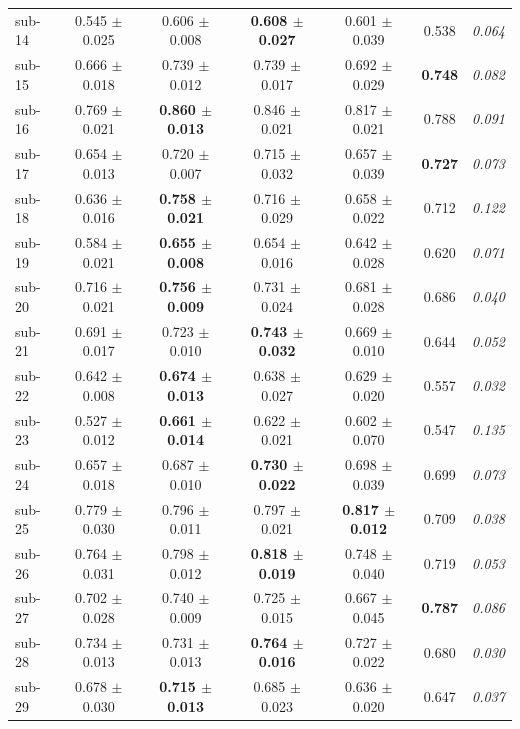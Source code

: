 \begin{table}[t]
\begin{tabular}{lcccccc}
sub-14 & 0.545 $\pm$ 0.025 & 0.606 $\pm$ 0.008 & \textbf{0.608 $\pm$ 0.027} & 0.601 $\pm$ 0.039 & 0.538 & \textit{0.064} \\
sub-15 & 0.666 $\pm$ 0.018 & 0.739 $\pm$ 0.012 & 0.739 $\pm$ 0.017 & 0.692 $\pm$ 0.029 & \textbf{0.748} & \textit{0.082} \\
sub-16 & 0.769 $\pm$ 0.021 & \textbf{0.860 $\pm$ 0.013} & 0.846 $\pm$ 0.021 & 0.817 $\pm$ 0.021 & 0.788 & \textit{0.091} \\
sub-17 & 0.654 $\pm$ 0.013 & 0.720 $\pm$ 0.007 & 0.715 $\pm$ 0.032 & 0.657 $\pm$ 0.039 & \textbf{0.727} & \textit{0.073} \\
sub-18 & 0.636 $\pm$ 0.016 & \textbf{0.758 $\pm$ 0.021} & 0.716 $\pm$ 0.029 & 0.658 $\pm$ 0.022 & 0.712 & \textit{0.122} \\
sub-19 & 0.584 $\pm$ 0.021 & \textbf{0.655 $\pm$ 0.008} & 0.654 $\pm$ 0.016 & 0.642 $\pm$ 0.028 & 0.620 & \textit{0.071} \\
sub-20 & 0.716 $\pm$ 0.021 & \textbf{0.756 $\pm$ 0.009} & 0.731 $\pm$ 0.024 & 0.681 $\pm$ 0.028 & 0.686 & \textit{0.040} \\
sub-21 & 0.691 $\pm$ 0.017 & 0.723 $\pm$ 0.010 & \textbf{0.743 $\pm$ 0.032} & 0.669 $\pm$ 0.010 & 0.644 & \textit{0.052} \\
sub-22 & 0.642 $\pm$ 0.008 & \textbf{0.674 $\pm$ 0.013} & 0.638 $\pm$ 0.027 & 0.629 $\pm$ 0.020 & 0.557 & \textit{0.032} \\
sub-23 & 0.527 $\pm$ 0.012 & \textbf{0.661 $\pm$ 0.014} & 0.622 $\pm$ 0.021 & 0.602 $\pm$ 0.070 & 0.547 & \textit{0.135} \\
sub-24 & 0.657 $\pm$ 0.018 & 0.687 $\pm$ 0.010 & \textbf{0.730 $\pm$ 0.022} & 0.698 $\pm$ 0.039 & 0.699 & \textit{0.073} \\
sub-25 & 0.779 $\pm$ 0.030 & 0.796 $\pm$ 0.011 & 0.797 $\pm$ 0.021 & \textbf{0.817 $\pm$ 0.012} & 0.709 & \textit{0.038} \\
sub-26 & 0.764 $\pm$ 0.031 & 0.798 $\pm$ 0.012 & \textbf{0.818 $\pm$ 0.019} & 0.748 $\pm$ 0.040 & 0.719 & \textit{0.053} \\
sub-27 & 0.702 $\pm$ 0.028 & 0.740 $\pm$ 0.009 & 0.725 $\pm$ 0.015 & 0.667 $\pm$ 0.045 & \textbf{0.787} & \textit{0.086} \\
sub-28 & 0.734 $\pm$ 0.013 & 0.731 $\pm$ 0.013 & \textbf{0.764 $\pm$ 0.016} & 0.727 $\pm$ 0.022 & 0.680 & \textit{0.030} \\
sub-29 & 0.678 $\pm$ 0.030 & \textbf{0.715 $\pm$ 0.013} & 0.685 $\pm$ 0.023 & 0.636 $\pm$ 0.020 & 0.647 & \textit{0.037} \\

\end{tabular}
\end{table}
